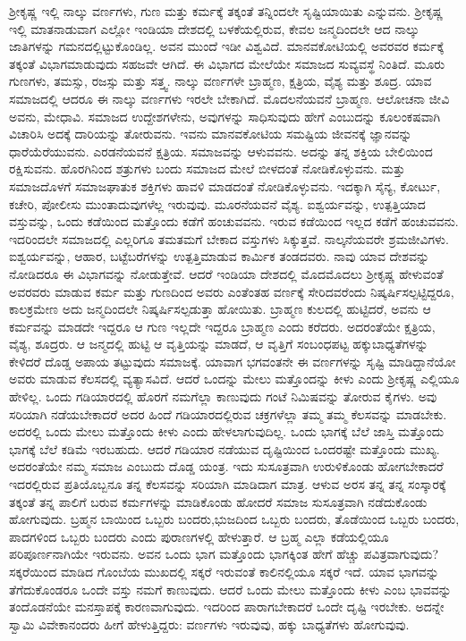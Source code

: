 ಶ‍್ರೀಕೃಷ್ಣ ಇಲ್ಲಿ ನಾಲ್ಕು ವರ್ಣಗಳು, ಗುಣ ಮತ್ತು ಕರ್ಮಕ್ಕೆ ತಕ್ಕಂತೆ ತನ್ನಿಂದಲೇ ಸೃಷ್ಟಿಯಾಯಿತು ಎನ್ನುವನು. ಶ‍್ರೀಕೃಷ್ಣ ಇಲ್ಲಿ ಮಾತನಾಡುವಾಗ ಎಲ್ಲೋ ಇಂಡಿಯಾ ದೇಶದಲ್ಲಿ ಬಳಕೆಯಲ್ಲಿರುವ, ಕೇವಲ ಜನ್ಮದಿಂದಲೇ ಆದ ನಾಲ್ಕು ಜಾತಿಗಳನ್ನು ಗಮನದಲ್ಲಿಟ್ಟುಕೊಂಡಿಲ್ಲ. ಅವನ ಮುಂದೆ ಇಡೀ ವಿಶ್ವವಿದೆ. ಮಾನವಕೋಟಿಯಲ್ಲಿ ಅವರವರ ಕರ್ಮಕ್ಕೆ ತಕ್ಕಂತೆ ವಿಭಾಗಮಾಡುವುದು ಸಹಜವೇ ಆಗಿದೆ. ಈ ವಿಭಾಗದ ಮೇಲೆಯೇ ಸಮಾಜದ ಸುವ್ಯವಸ್ಥೆ ನಿಂತಿದೆ. ಮೂರು ಗುಣಗಳು, ತಮಸ್ಸು, ರಜಸ್ಸು ಮತ್ತು ಸತ್ತ್ವ. ನಾಲ್ಕು ವರ್ಣಗಳೇ ಬ್ರಾಹ್ಮಣ, ಕ್ಷತ್ರಿಯ, ವೈಶ್ಯ ಮತ್ತು ಶೂದ್ರ. ಯಾವ ಸಮಾಜದಲ್ಲಿ ಆದರೂ ಈ ನಾಲ್ಕು ವರ್ಣಗಳು ಇರಲೇ ಬೇಕಾಗಿದೆ. ಮೊದಲನೆಯವನೆ ಬ್ರಾಹ್ಮಣ. ಆಲೋಚನಾ ಜೀವಿ ಅವನು, ಮೇಧಾವಿ. ಸಮಾಜದ ಉದ್ದೇಶಗಳೇನು, ಅವುಗಳನ್ನು ಸಾಧಿಸುವುದು ಹೇಗೆ ಎಂಬುದನ್ನು ಕೂಲಂಕಷವಾಗಿ ವಿಚಾರಿಸಿ ಅದಕ್ಕೆ ದಾರಿಯನ್ನು ತೋರುವನು. ಇವನು ಮಾನವಕೋಟಿಯ ಸಮಷ್ಟಿಯ ಜೀವನಕ್ಕೆ ಜ್ಞಾನವನ್ನು ಧಾರೆಯೆರೆಯುವನು. ಎರಡನೆಯವನೆ ಕ್ಷತ್ರಿಯ. ಸಮಾಜವನ್ನು ಆಳುವವನು. ಅದನ್ನು ತನ್ನ ಶಕ್ತಿಯ ಬೇಲಿಯಿಂದ ರಕ್ಷಿಸುವನು. ಹೊರಗಿನಿಂದ ಶತ್ರುಗಳು ಬಂದು ಸಮಾಜದ ಮೇಲೆ ಬೀಳದಂತೆ ನೋಡಿಕೊಳ್ಳುವನು. ಮತ್ತು ಸಮಾಜದೊಳಗೆ ಸಮಾಜಘಾತುಕ ಶಕ್ತಿಗಳು ಹಾವಳಿ ಮಾಡದಂತೆ ನೋಡಿಕೊಳ್ಳುವನು. ಇದಕ್ಕಾಗಿ ಸೈನ್ಯ, ಕೋರ್ಟು, ಕಚೇರಿ, ಪೋಲೀಸು ಮುಂತಾದುವುಗಳೆಲ್ಲ ಇರುವುವು. ಮೂರನೆಯವನೆ ವೈಶ್ಯ. ಐಶ್ವರ್ಯವನ್ನು, ಉತ್ಪತ್ತಿಯಾದ ವಸ್ತುವನ್ನು, ಒಂದು ಕಡೆಯಿಂದ ಮತ್ತೊಂದು ಕಡೆಗೆ ಹಂಚುವವನು. ಇರುವ ಕಡೆಯಿಂದ ಇಲ್ಲದ ಕಡೆಗೆ ಹಂಚುವವನು. ಇದರಿಂದಲೇ ಸಮಾಜದಲ್ಲಿ ಎಲ್ಲರಿಗೂ ತಮತಮಗೆ ಬೇಕಾದ ವಸ್ತುಗಳು ಸಿಕ್ಕುತ್ತವೆ. ನಾಲ್ಕನೆಯವರೇ ಶ್ರಮಜೀವಿಗಳು. ಐಶ್ವರ್ಯವನ್ನು, ಆಹಾರ, ಬಟ್ಟೆಬರೆಗಳನ್ನು ಉತ್ಪತ್ತಿಮಾಡುವ ಕಾರ್ಮಿಕ ತಂಡದವರು. ನಾವು ಯಾವ ದೇಶವನ್ನು ನೋಡಿದರೂ ಈ ವಿಭಾಗವನ್ನು ನೋಡುತ್ತೇವೆ. ಆದರೆ ಇಂಡಿಯಾ ದೇಶದಲ್ಲಿ ಮೊದಮೊದಲು ಶ‍್ರೀಕೃಷ್ಣ ಹೇಳುವಂತೆ ಅವರವರು ಮಾಡುವ ಕರ್ಮ ಮತ್ತು ಗುಣದಿಂದ ಅವರು ಎಂತೆಂತಹ ವರ್ಣಕ್ಕೆ ಸೇರಿದವರೆಂದು ನಿಷ್ಕರ್ಷಿಸಲ್ಪಟ್ಟಿದ್ದರೂ, ಕಾಲಕ್ರಮೇಣ ಅದು ಜನ್ಮದಿಂದಲೇ ನಿಷ್ಕರ್ಷಿಸಲ್ಪಡುತ್ತಾ ಹೋಯಿತು. ಬ್ರಾಹ್ಮಣ ಕುಲದಲ್ಲಿ ಹುಟ್ಟಿದರೆ, ಅವನು ಆ ಕರ್ಮವನ್ನು ಮಾಡದೇ ಇದ್ದರೂ ಆ ಗುಣ ಇಲ್ಲದೇ ಇದ್ದರೂ ಬ್ರಾಹ್ಮಣ ಎಂದು ಕರೆದರು. ಅದರಂತೆಯೇ ಕ್ಷತ್ರಿಯ, ವೈಶ್ಯ, ಶೂದ್ರರು. ಆ ಜನ್ಮದಲ್ಲಿ ಹುಟ್ಟಿ ಆ ವೃತ್ತಿಯನ್ನು ಮಾಡದೆ, ಆ ವೃತ್ತಿಗೆ ಸಂಬಂಧಪಟ್ಟ ಹಕ್ಕುಬಾಧ್ಯತೆಗಳನ್ನು ಕೇಳಿದರೆ ದೊಡ್ಡ ಅಪಾಯ ತಟ್ಟುವುದು ಸಮಾಜಕ್ಕೆ. ಯಾವಾಗ ಭಗವಂತನೇ ಈ ವರ್ಣಗಳನ್ನು ಸೃಷ್ಟಿ ಮಾಡಿದ್ದಾನೆಯೋ ಅವರು ಮಾಡುವ ಕೆಲಸದಲ್ಲಿ ವ್ಯತ್ಯಾಸವಿದೆ. ಆದರೆ ಒಂದನ್ನು ಮೇಲು ಮತ್ತೊಂದನ್ನು ಕೀಳು ಎಂದು ಶ‍್ರೀಕೃಷ್ಣ ಎಲ್ಲಿಯೂ ಹೇಳಿಲ್ಲ. ಒಂದು ಗಡಿಯಾರದಲ್ಲಿ ಹೊರಗೆ ನಮಗೆಲ್ಲಾ ಕಾಣುವುದು ಗಂಟೆ ನಿಮಿಷವನ್ನು ತೋರುವ ಕೈಗಳು. ಅವು ಸರಿಯಾಗಿ ನಡೆಯಬೇಕಾದರೆ ಅದರ ಹಿಂದೆ ಗಡಿಯಾರದಲ್ಲಿರುವ ಚಕ್ರಗಳೆಲ್ಲಾ ತಮ್ಮ ತಮ್ಮ ಕೆಲಸವನ್ನು ಮಾಡಬೇಕು. ಅದರಲ್ಲಿ ಒಂದು ಮೇಲು ಮತ್ತೊಂದು ಕೀಳು ಎಂದು ಹೇಳಲಾಗುವುದಿಲ್ಲ. ಒಂದು ಭಾಗಕ್ಕೆ ಬೆಲೆ ಜಾಸ್ತಿ ಮತ್ತೊಂದು ಭಾಗಕ್ಕೆ ಬೆಲೆ ಕಡಿಮೆ ಇರಬಹುದು. ಆದರೆ ಗಡಿಯಾರ ನಡೆಯುವ ದೃಷ್ಟಿಯಿಂದ ಒಂದರಷ್ಟೇ ಮತ್ತೊಂದು ಮುಖ್ಯ. ಅದರಂತೆಯೇ ನಮ್ಮ ಸಮಾಜ ಎಂಬುದು ದೊಡ್ಡ ಯಂತ್ರ. ಇದು ಸುಸೂತ್ರವಾಗಿ ಉರುಳಿಕೊಂಡು ಹೋಗಬೇಕಾದರೆ ಇದರಲ್ಲಿರುವ ಪ್ರತಿಯೊಬ್ಬನೂ ತನ್ನ ಕೆಲಸವನ್ನು ಸರಿಯಾಗಿ ಮಾಡಿದಾಗ ಮಾತ್ರ. ಆಳುವ ಅರಸ ತನ್ನ ತನ್ನ ಸಂಸ್ಕಾರಕ್ಕೆ ತಕ್ಕಂತೆ ತನ್ನ ಪಾಲಿಗೆ ಬರುವ ಕರ್ಮಗಳನ್ನು ಮಾಡಿಕೊಂಡು ಹೋದರೆ ಸಮಾಜ ಸುಸೂತ್ರವಾಗಿ ನಡೆದುಕೊಂಡು ಹೋಗುವುದು. ಬ್ರಹ್ಮನ ಬಾಯಿಂದ ಒಬ್ಬರು ಬಂದರು,\break ಭುಜದಿಂದ ಒಬ್ಬರು ಬಂದರು, ತೊಡೆಯಿಂದ ಒಬ್ಬರು ಬಂದರು, ಪಾದಗಳಿಂದ ಒಬ್ಬರು ಬಂದರು ಎಂದು ಪುರಾಣಗಳಲ್ಲಿ ಹೇಳುತ್ತಾರೆ. ಆ ಬ್ರಹ್ಮ ಎಲ್ಲಾ ಕಡೆಯಲ್ಲಿಯೂ ಪರಿಪೂರ್ಣನಾಗಿಯೇ ಇರುವನು. ಅವನ ಒಂದು ಭಾಗ ಮತ್ತೊಂದು ಭಾಗಕ್ಕಿಂತ ಹೇಗೆ ಹೆಚ್ಚು ಪವಿತ್ರವಾಗುವುದು? ಸಕ್ಕರೆಯಿಂದ ಮಾಡಿದ ಗೊಂಬೆಯ ಮುಖದಲ್ಲಿ ಸಕ್ಕರೆ ಇರುವಂತೆ ಕಾಲಿನಲ್ಲಿಯೂ ಸಕ್ಕರೆ ಇದೆ. ಯಾವ ಭಾಗವನ್ನು ತೆಗೆದುಕೊಂಡರೂ ಒಂದೇ ವಸ್ತು ನಮಗೆ ಕಾಣುವುದು. ಆದರೆ ಒಂದು ಮೇಲು ಮತ್ತೊಂದು ಕೀಳು ಎಂಬ ಭಾವವನ್ನು ತಂದೊಡನೆಯೇ ಮನಸ್ತಾಪಕ್ಕೆ ಕಾರಣವಾಗುವುದು. ಇದರಿಂದ ಪಾರಾಗಬೇಕಾದರೆ ಒಂದೇ ದೃಷ್ಟಿ ಇರಬೇಕು. ಅದನ್ನೇ ಸ್ವಾಮಿ ವಿವೇಕಾ\-ನಂದರು ಹೀಗೆ ಹೇಳುತ್ತಿದ್ದರು: ವರ್ಣಗಳು ಇರುವುವು, ಹಕ್ಕು ಬಾಧ್ಯತೆಗಳು ಹೋಗುವುವು.

